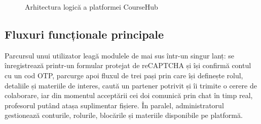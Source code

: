 \begin{figure}[h]
\centering
{}
\caption{Arhitectura logică a platformei CourseHub}
\label{fig:arhitectura}
\end{figure}

\subsection{Fluxuri funcționale principale}

Parcursul unui utilizator leagă modulele de mai sus într-un singur lanț: se
înregistrează printr-un formular protejat de reCAPTCHA și își confirmă contul cu
un cod OTP, parcurge apoi fluxul de trei pași prin care își definește rolul,
detaliile și materiile de interes, caută un partener potrivit și îi trimite o
cerere de colaborare, iar din momentul acceptării cei doi comunică prin chat în
timp real, profesorul putând atașa suplimentar fișiere. În paralel,
administratorul gestionează conturile, rolurile, blocările și materiile
disponibile pe platformă.
